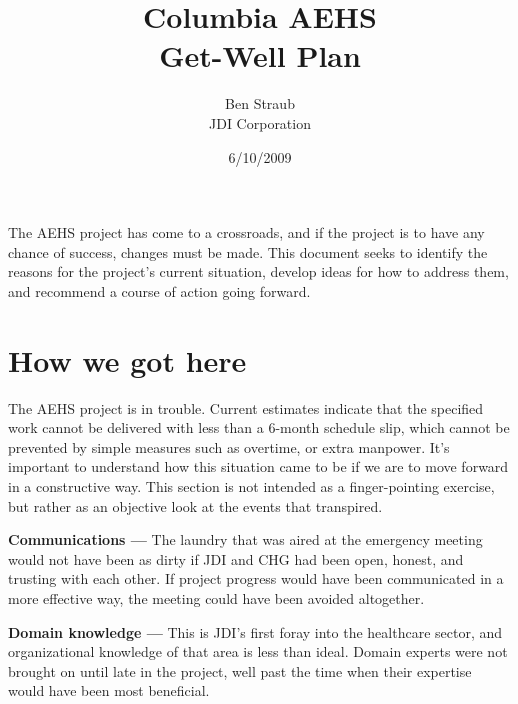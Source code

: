 \documentclass[12pt]{article}
\begin{document}

\title{Columbia AEHS\\Get-Well Plan}
\author{Ben Straub\\JDI Corporation}
\date{6/10/2009}
\maketitle
\thispagestyle{empty}



\vskip 1in

The AEHS project has come to a crossroads, and if the project is to have any chance of success,
changes must be made.  This document seeks to identify the reasons for the project's current
situation, develop ideas for how to address them, and recommend a course of action going forward.

\clearpage



\section{How we got here}

The AEHS project is in trouble.  Current estimates indicate that the specified work cannot be
delivered with less than a 6-month schedule slip, which cannot be prevented by simple measures such
as overtime, or extra manpower.  It's important to understand how this situation came to be if we
are to move forward in a constructive way.  This section is not intended as a finger-pointing
exercise, but rather as an objective look at the events that transpired.
\todo{}

{\bf Communications ---} The laundry that was aired at the emergency meeting would not have been as
dirty if JDI and CHG had been open, honest, and trusting with each other.  If project progress would
have been communicated in a more effective way, the meeting could have been avoided altogether.

{\bf Domain knowledge ---} This is JDI's first foray into the healthcare sector, and organizational
knowledge of that area is less than ideal.  Domain experts were not brought on until late in the
project, well past the time when their expertise would have been most beneficial.
\end{document}
